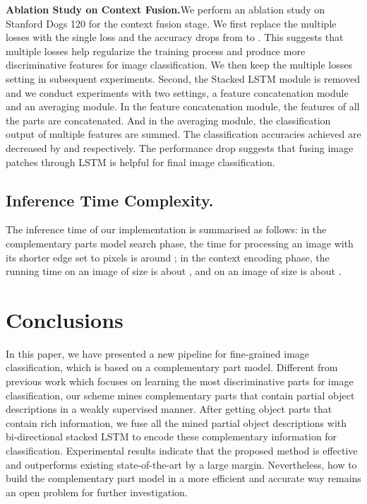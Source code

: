 \documentclass[10pt,twocolumn,letterpaper]{article}
\begin{document}
\textbf{Ablation Study on Context Fusion.}We perform an ablation study on Stanford Dogs 120 for the context fusion stage. We first replace the multiple losses with the single loss and the accuracy drops from  to . This suggests that multiple losses help regularize the training process and produce more discriminative features for image classification. We then keep the multiple losses setting in subsequent experiments. Second, the Stacked LSTM module is removed and we conduct experiments with two settings, a feature concatenation module and an averaging module. In the feature concatenation module, the features of all the  parts are concatenated. And in the averaging module, the classification output of multiple features are summed. The classification accuracies achieved are decreased by  and  respectively. The performance drop suggests that fusing  image patches through LSTM is helpful for final image classification.

\subsection{Inference Time Complexity.}
The inference time of our implementation is summarised as follows: in the complementary parts model search phase, the time for processing an image with its shorter edge set to  pixels is around ; in the context encoding phase, the running time on an image of size  is about , and on an image of size  is about .
\vspace{0mm}

\section{Conclusions}
In this paper, we have presented a new pipeline for fine-grained image classification, which is based on a complementary part model. Different from previous work which focuses on learning the most discriminative parts for image classification, our scheme mines complementary parts that contain partial object descriptions in a weakly supervised manner. After getting object parts that contain rich information, we fuse all the mined partial object descriptions with bi-directional stacked LSTM to encode these complementary information for classification. Experimental results indicate that the proposed method is effective and outperforms existing state-of-the-art by a large margin. Nevertheless, how to build the complementary part model in a more efficient and accurate way remains an open problem for further investigation.
{\small


}
\end{document}
